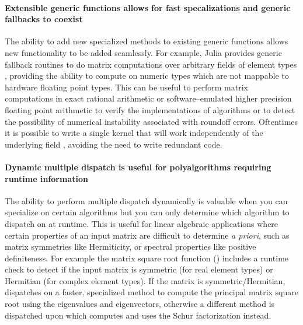 \documentclass[pldi]{sigplanconf-pldi15}
\begin{document}
\paragraph{Extensible generic functions allows for fast specalizations and generic fallbacks to coexist}
The ability to add new specialized methods to existing generic functions allows
new functionality to be added seamlessly. For example, Julia provides generic
fallback routines to do matrix computations over arbitrary fields of element
types , providing the ability to compute on numeric types which are not
mappable to hardware floating point types. This can be useful to perform matrix
computations in exact rational arithmetic or software--emulated higher
precision floating point arithmetic to verify the implementations of algorithms
or to detect the possibility of numerical instability associated with roundoff
errors. Oftentimes it is possible to write a single kernel that will work
independently of the underlying field , avoiding the need to write
redundant code.

\paragraph{Dynamic multiple dispatch is useful for polyalgorithms requiring runtime information}
The ability to perform multiple dispatch dynamically is valuable when you can
specialize on certain algorithms but you can only determine which algorithm to
dispatch on at runtime. This is useful for linear algebraic applications where
certain properties of an input matrix are difficult to determine \textit{a
priori}, such as matrix symmetries like Hermiticity, or spectral properties
like positive definiteness. For example the matrix square root function
() includes a runtime check to detect if the input matrix is
symmetric (for real element types) or Hermitian (for complex element types). If
the matrix is symmetric/Hermitian,  dispatches on a faster,
specialized method to compute the principal matrix square root using the
eigenvalues and eigenvectors, otherwise a different method is dispatched upon
which computes and uses the Schur factorization instead.
\end{document}
